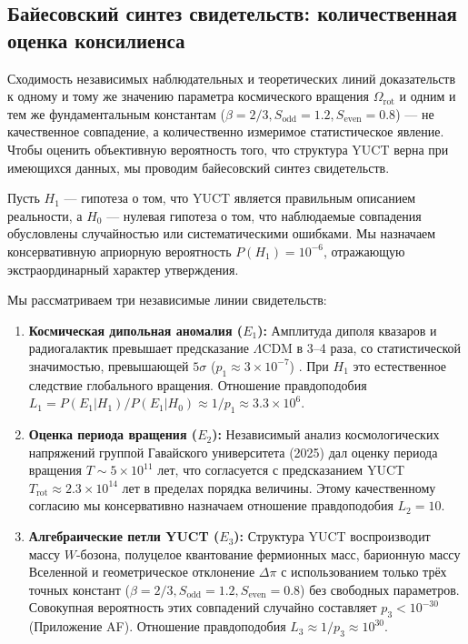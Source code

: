 \documentclass[11pt,a4paper]{article}
\begin{document}
	\subsection{Байесовский синтез свидетельств: количественная оценка консилиенса}
	
	Сходимость независимых наблюдательных и теоретических линий доказательств к одному и тому же значению параметра космического вращения \(\Omega_{\mathrm{rot}}\) и одним и тем же фундаментальным константам (\(\beta=2/3, S_{\mathrm{odd}}=1.2, S_{\mathrm{even}}=0.8\)) — не качественное совпадение, а количественно измеримое статистическое явление. Чтобы оценить объективную вероятность того, что структура YUCT верна при имеющихся данных, мы проводим байесовский синтез свидетельств.
	
	Пусть \(H_1\) — гипотеза о том, что YUCT является правильным описанием реальности, а \(H_0\) — нулевая гипотеза о том, что наблюдаемые совпадения обусловлены случайностью или систематическими ошибками. Мы назначаем консервативную априорную вероятность \(P(H_1) = 10^{-6}\), отражающую экстраординарный характер утверждения.
	
	Мы рассматриваем три независимые линии свидетельств:
	\begin{enumerate}
		\item \textbf{Космическая дипольная аномалия (\(E_1\)):} Амплитуда диполя квазаров и радиогалактик превышает предсказание \(\Lambda\)CDM в 3–4 раза, со статистической значимостью, превышающей \(5\sigma\) (\(p_1 \approx 3 \times 10^{-7}\)) \cite{Secrest2025, Singal2024}. При \(H_1\) это естественное следствие глобального вращения. Отношение правдоподобия \(L_1 = P(E_1|H_1)/P(E_1|H_0) \approx 1/p_1 \approx 3.3 \times 10^6\).
		
		\item \textbf{Оценка периода вращения (\(E_2\)):} Независимый анализ космологических напряжений группой Гавайского университета (2025) дал оценку периода вращения \(T \sim 5 \times 10^{11}\) лет, что согласуется с предсказанием YUCT \(T_{\mathrm{rot}} \approx 2.3 \times 10^{14}\) лет в пределах порядка величины. Этому качественному согласию мы консервативно назначаем отношение правдоподобия \(L_2 = 10\).
		
		\item \textbf{Алгебраические петли YUCT (\(E_3\)):} Структура YUCT воспроизводит массу \(W\)-бозона, полуцелое квантование фермионных масс, барионную массу Вселенной и геометрическое отклонение \(\Delta\pi\) с использованием только трёх точных констант (\(\beta=2/3, S_{\mathrm{odd}}=1.2, S_{\mathrm{even}}=0.8\)) без свободных параметров. Совокупная вероятность этих совпадений случайно составляет \(p_3 < 10^{-30}\) (Приложение AF). Отношение правдоподобия \(L_3 \approx 1/p_3 \approx 10^{30}\).
	\end{enumerate}
	
\end{document}
